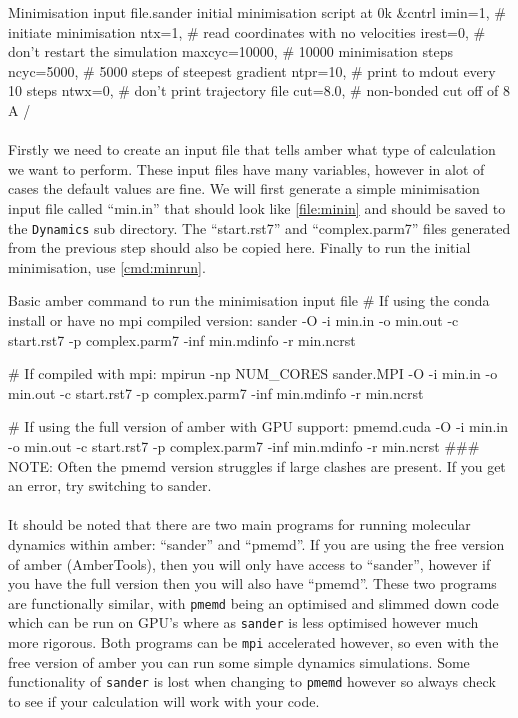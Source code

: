 \begin{inpfile}[label=file:minin]{Minimisation input file.}{sander}
initial minimisation script at 0k
&cntrl
  imin=1,       # initiate minimisation
  ntx=1,        # read coordinates with no velocities
  irest=0,      # don't restart the simulation
  maxcyc=10000, # 10000 minimisation steps
  ncyc=5000,    # 5000 steps of steepest gradient
  ntpr=10,      # print to mdout every 10 steps
  ntwx=0,       # don't print trajectory file
  cut=8.0,      # non-bonded cut off of 8 A
/

\end{inpfile}

    \paragraph{}
        Firstly we need to create an input file that tells amber what type of calculation we want to perform. These input files have many variables, however in alot of cases the default values are fine. We will first generate a simple minimisation input file called \enquote{min.in} that should look like \cref{file:minin} and should be saved to the \texttt{Dynamics} sub directory. The \enquote{start.rst7} and \enquote{complex.parm7} files generated from the previous step should also be copied here. Finally to run the initial minimisation, use \cref{cmd:minrun}.
        
\begin{bashcmd}[label=cmd:minrun]{Basic amber command to run the minimisation input file}
# If using the conda install or have no mpi compiled version:
sander -O -i min.in -o min.out -c start.rst7 -p complex.parm7 -inf min.mdinfo -r min.ncrst

# If compiled with mpi:
mpirun -np NUM_CORES sander.MPI -O -i min.in -o min.out -c start.rst7 -p complex.parm7 -inf min.mdinfo -r min.ncrst

# If using the full version of amber with GPU support:
pmemd.cuda -O -i min.in -o min.out -c start.rst7 -p complex.parm7 -inf min.mdinfo -r min.ncrst
### NOTE: Often the pmemd version struggles if large clashes are present. If you get an error, try switching to sander.
\end{bashcmd}

    \paragraph{}
        It should be noted that there are two main programs for running molecular dynamics within amber: \enquote{sander} and \enquote{pmemd}. If you are using the free version of amber (AmberTools), then you will only have access to  \enquote{sander}, however if you have the full version then you will also have \enquote{pmemd}. These two programs are functionally similar, with \texttt{pmemd} being an optimised and slimmed down code which can be run on GPU's where as \texttt{sander} is less optimised however much more rigorous. Both programs can be \texttt{mpi} accelerated however, so even with the free version of amber you can run some simple dynamics simulations. Some functionality of \texttt{sander} is lost when changing to \texttt{pmemd} however so always check to see if your calculation will work with your code.

